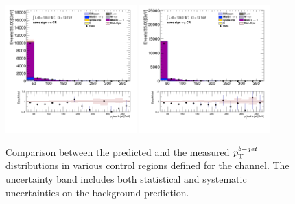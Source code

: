 \begin{figure}[!htp]
\begin{center}
			\includegraphics[width=0.45\textwidth]{chapters/chapter6_HPlus/images/taulep/bjet_0_pt_SS_TAUEL.png} 
			\includegraphics[width=0.45\textwidth]{chapters/chapter6_HPlus/images/taulep/bjet_0_pt_SS_TAUMU.png} \\
			\end{center}
			\caption{
			Comparison between the predicted and the measured $p_{\text{T}}^{b-jet}$ distributions in various control regions defined for the \taulep channel. The uncertainty band includes both statistical and systematic uncertainties on the background prediction. 
			}
			\label{fig:bkg-pt-bjet-taulep}
		\end{figure}

